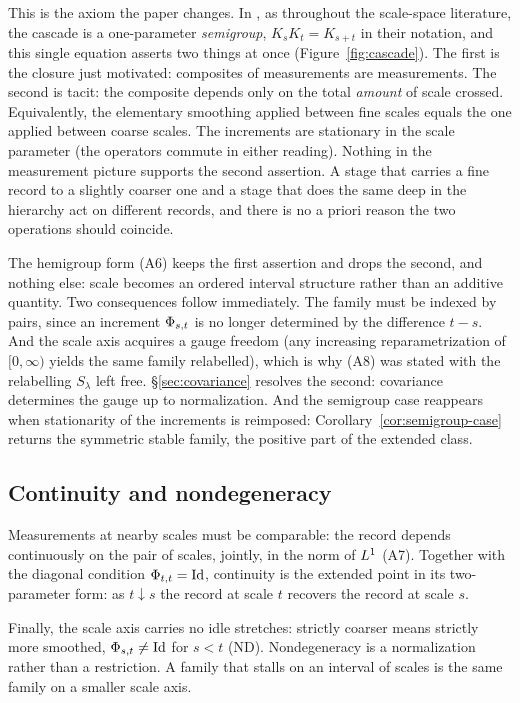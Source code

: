 This is the axiom the paper changes. In , as throughout the
scale-space literature, the cascade is a one-parameter \emph{semigroup},
$K_sK_t = K_{s+t}$ in their notation, and this single equation asserts two things at once
(Figure~\ref{fig:cascade}). The first is the closure just motivated: composites of
measurements are measurements. The second is tacit: the composite depends only on the
total \emph{amount} of scale crossed. Equivalently, the elementary smoothing applied
between fine scales equals the one applied between coarse scales. The increments are
stationary in the scale parameter (the operators commute in either reading). Nothing in
the measurement picture supports the second assertion. A
stage that carries a fine record to a slightly coarser one and a stage that does the same
deep in the hierarchy act on different records, and there is no a priori reason the two
operations should coincide.

The hemigroup form (A6) keeps the first assertion and drops the second, and nothing else:
scale becomes an ordered interval structure rather than an additive quantity. Two
consequences follow immediately. The family must be indexed by pairs, since an increment
$\Phi_{s,t}$ is no longer determined by the difference $t - s$. And the scale axis
acquires a gauge freedom (any increasing reparametrization of $[0,\infty)$ yields the
same family relabelled), which is why (A8) was stated with the relabelling $S_\lambda$
left free. \S\ref{sec:covariance} resolves the second: covariance determines the gauge up
to normalization. And the semigroup case reappears when stationarity of the increments is
reimposed: Corollary~\ref{cor:semigroup-case} returns the symmetric stable family, the
positive part of the extended class.

\subsection{Continuity and nondegeneracy}\label{sec:axioms-continuity}

Measurements at nearby scales must be comparable: the record depends continuously on the
pair of scales, jointly, in the norm of $L^1$ (A7). Together with the diagonal condition
$\Phi_{t,t} = \mathrm{Id}$, continuity is the extended point in its two-parameter form: as
$t \downarrow s$ the record at scale $t$ recovers the record at scale $s$.

Finally, the scale axis carries no idle stretches: strictly coarser means strictly more
smoothed, $\Phi_{s,t} \ne \mathrm{Id}$ for $s < t$ (ND). Nondegeneracy is a normalization
rather than a restriction. A family that stalls on an interval of scales is the same
family on a smaller scale axis.

